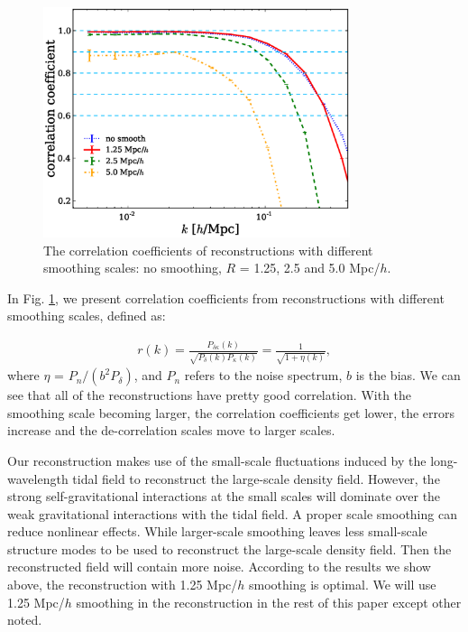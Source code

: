 \documentclass[aps,prd,twocolumn,showpacs,superscriptaddress,groupedaddress,nofootinbib]{revtex4}  %
\begin{document}
\begin{figure}[h!]
     \centering
     \includegraphics[width=9cm]{1D_correlation_aver_smooth.eps}
     \caption{The correlation coefficients of reconstructions with different smoothing scales: no smoothing, $R$ = 1.25, 2.5 and 5.0 Mpc/$h$. }
     \label{1D_correlation_aver_smooth}
\end{figure}

In Fig. \ref{1D_correlation_aver_smooth}, we present correlation coefficients from reconstructions with different smoothing scales, defined as:

\begin{eqnarray}
r(k) = \frac{P_{\delta\kappa}(k)}{\sqrt{P_{\delta}(k)P_{\kappa}(k)}} = \frac{1}{\sqrt{1+\eta(k)}},
\label{correlation}
\end{eqnarray}
where $\eta$ = $P_{n}/(b^{2}P_{\delta})$, and $P_{n}$ refers to the noise spectrum, $b$ is the bias.
We can see that all of the reconstructions have pretty good correlation. With the smoothing scale becoming larger, the correlation coefficients get lower, the errors increase and the de-correlation scales move to larger scales.

Our reconstruction makes use of the small-scale fluctuations induced by the long-wavelength tidal field to reconstruct the large-scale density field. However, the strong self-gravitational interactions at the small scales will dominate over the weak gravitational interactions with the tidal field. A proper scale smoothing can reduce nonlinear effects. While larger-scale smoothing leaves less small-scale structure modes to be used to reconstruct the large-scale density field. Then the reconstructed field will contain more noise. According to the results we show above, the reconstruction with 1.25 Mpc/$h$ smoothing is optimal. We will use 1.25 Mpc/$h$ smoothing in the reconstruction in the rest of this paper except other noted. 
\end{document}

